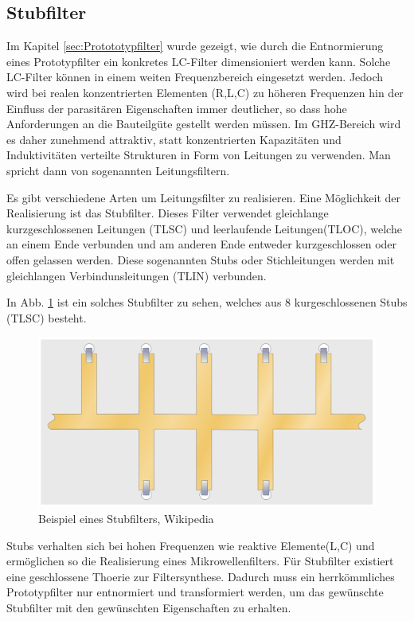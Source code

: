 \subsection{Stubfilter}

Im Kapitel \ref{sec:Protototypfilter} wurde gezeigt, wie durch die Entnormierung eines Prototypfilter ein konkretes LC-Filter dimensioniert werden kann. Solche LC-Filter  können in einem weiten Frequenzbereich  eingesetzt  werden.  Jedoch
wird  bei realen konzentrierten Elementen (R,L,C) zu höheren Frequenzen hin der Einfluss der parasitären Eigenschaften immer deutlicher, so dass hohe Anforderungen an die Bauteilgüte  gestellt  werden  müssen. Im GHZ-Bereich wird es daher  zunehmend attraktiv,  statt  konzentrierten  Kapazitäten  und  Induktivitäten  verteilte
Strukturen  in  Form  von  Leitungen  zu  verwenden.\cite[p.~203]{ref:gustrau}  Man  spricht   dann  von sogenannten Leitungsfiltern.



Es gibt verschiedene Arten um  Leitungsfilter zu realisieren. Eine Möglichkeit der  Realisierung  ist das Stubfilter.  Dieses  Filter  verwendet  gleichlange kurzgeschlossenen Leitungen (TLSC) und  leerlaufende  Leitungen(TLOC), welche an einem Ende verbunden und am anderen Ende entweder kurzgeschlossen
oder offen gelassen werden. Diese sogenannten Stubs oder Stichleitungen werden mit gleichlangen Verbindunsleitungen (TLIN) verbunden. 

In Abb. \ref{fig:Stubfilter} ist ein solches Stubfilter zu sehen, welches aus 8 kurgeschlossenen Stubs (TLSC) besteht.

\begin{figure}[h!]
\centering
 	\includegraphics[width=\imagewidth]{images/Stripline_Stub_Filter}
 	\caption{Beispiel eines Stubfilters, Wikipedia \cite{ref:wikipedia:stripline}}
 	\label{fig:Stubfilter}
\end{figure}

Stubs verhalten sich bei  hohen  Frequenzen  wie  reaktive Elemente(L,C) und ermöglichen so die Realisierung  eines  Mikrowellenfilters. Für Stubfilter existiert eine geschlossene Thoerie zur Filtersynthese. Dadurch muss ein herrkömmliches Prototypfilter nur entnormiert und transformiert werden, um das gewünschte Stubfilter mit den gewünschten Eigenschaften zu erhalten.

